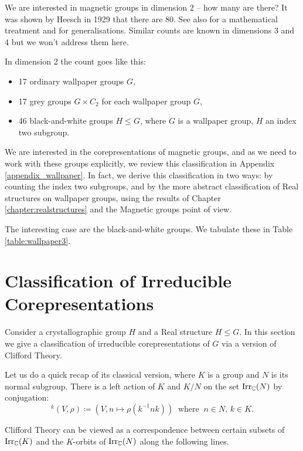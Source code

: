 We are interested in magnetic groups in dimension $2$ -- how many are there? It was shown by Heesch \cite{Heesch} in 1929 that there are 80. See also \cite{Schat} for a mathematical treatment and \cite{PaZa, Souv, Zamo} for generalisations. Similar counts are known in dimensions 3 and 4 \cite{Souv} but we won't address them here.

In dimension 2 the count goes like this:
  \begin{itemize}
  \item 17 ordinary wallpaper groups $G$,
  \item 17 grey groups $G\times C_2$ for each wallpaper group $G$,
  \item 46 black-and-white groups $H\leq G$, where $G$ is a wallpaper group, $H$ an index two subgroup.
  \end{itemize}

We are interested in the corepresentations of magnetic groups, and as we need to work with these groups explicitly, we review this classification in Appendix \ref{appendix_wallpaper}. In fact, we derive this classification in two ways: by counting the index two subgroups, and by the more abstract classification of Real structures on wallpaper groups, using the results of Chapter \ref{chapter:realstructures} and the Magnetic groups point of view.

The interesting case are the black-and-white groups. We tabulate these in Table \ref{table:wallpaper3}.

\section{Classification of Irreducible Corepresentations}\label{sect:cliffordtheory}
Consider a crystallographic group $H$ and a Real structure $H\leq G$.
In this section we give a classification of irreducible corepresentations of $G$ via
a version of Clifford Theory. 

Let us do a quick recap of its classical version, where $K$ is a group and $N$ is its normal subgroup.
There is a left action of $K$ and $K/N$ on the set ${\operatorname{Irr}_{{\mathbb C}}(N)}$ by conjugation:
\begin{equation} \label{Cliff_1a}
  {}^{k}(V,\rho) \coloneqq (V, n \mapsto \rho (k^{-1}nk)) \ \mbox{ where } \ n\in N, \, k\in K.
  \end{equation} 

Clifford Theory can be viewed as a correspondence between certain subsets of ${\operatorname{Irr}_{{\mathbb C}}(K)}$ and the $K$-orbits of ${\operatorname{Irr}_{{\mathbb C}}(N)}$ along the following lines.

